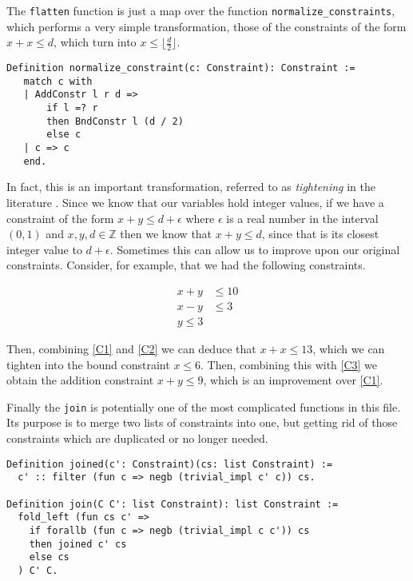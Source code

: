 The \texttt{flatten} function is just a map over the function 
\texttt{normalize_constraints}, which performs a very simple transformation, those of 
the constraints of the form $x + x \le d$, which turn into $x \le \lfloor \frac{d}{2}\rfloor$.

\begin{verbatim}
Definition normalize_constraint(c: Constraint): Constraint :=
   match c with
   | AddConstr l r d => 
       if l =? r 
       then BndConstr l (d / 2)
       else c
   | c => c
   end.
\end{verbatim}

In fact, this is an important transformation, referred to as \emph{tightening} in the
literature \cite{TransitiveClosure}. Since we know that our variables hold integer
values, if we have a constraint of the form $x + y \le d + \epsilon$ where $\epsilon$
is a real number in the interval $(0,1)$ and $x,y,d\in \mathbb{Z}$ then we know that 
$x + y \le d$, since that is its closest integer value to $d+\epsilon$. Sometimes this
can allow us to improve upon our original constraints. Consider, for example, that we 
had the following constraints.

\begin{align}
    \label{C1} x + y &\le 10  \\
    \label{C2} x - y &\le 3 \\
    \label{C3} y \le 3
\end{align}

Then, combining \ref{C1} and \ref{C2} we can deduce that $x + x \le 13$, which we can
tighten into the bound constraint $x \le 6$. Then, combining this with \ref{C3} we 
obtain the addition constraint $x + y \le 9$, which is an improvement over \ref{C1}.

Finally the \texttt{join} is potentially one of the most complicated functions
in this file. Its purpose is to merge two lists of constraints into one, but getting 
rid of those constraints which are duplicated or no longer needed.

\begin{verbatim}
Definition joined(c': Constraint)(cs: list Constraint) :=
  c' :: filter (fun c => negb (trivial_impl c' c)) cs.

Definition join(C C': list Constraint): list Constraint :=
  fold_left (fun cs c' => 
    if forallb (fun c => negb (trivial_impl c c')) cs
    then joined c' cs
    else cs
  ) C' C.
\end{verbatim}

